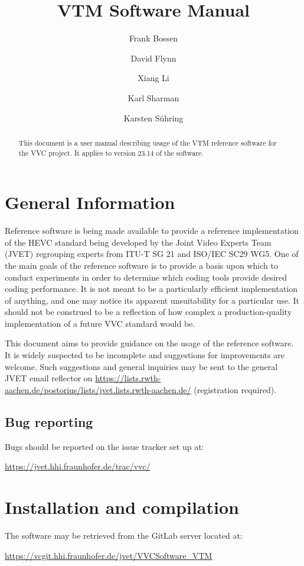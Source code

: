 \documentclass[a4paper,11pt]{jvetdoc}
\title{VTM Software Manual}
\author{%
	Frank Bossen
	\email{frank@bossentech.com}
	\and
	David Flynn
	\and
	Xiang Li
	\email{xlxiangli@google.com}
	\and
	Karl Sharman
	\email{karl.sharman@eu.sony.com}
	\and
	Karsten S\"uhring
	\email{karsten.suehring@hhi.fraunhofer.de}
}
\begin{document}
\maketitle
\begin{abstract}
This document is a user manual describing usage of the VTM reference software
for the VVC project. It applies to version 23.14 of the software.
\end{abstract}

\tableofcontents
\listoftables


\section{General Information}
Reference software is being made available to provide a reference
implementation of the HEVC standard being developed by the Joint 
Video Experts Team (JVET) regrouping experts from
ITU-T SG 21 and ISO/IEC SC29 WG5. One of the main goals of the
reference software is to provide a basis upon which to conduct
experiments in order to determine which coding tools provide desired
coding performance. It is not meant to be a particularly efficient
implementation of anything, and one may notice its apparent
unsuitability for a particular use. It should not be construed to be a
reflection of how complex a production-quality implementation of a
future VVC standard would be.

This document aims to provide guidance on the usage of the reference
software. It is widely suspected to be incomplete and suggestions for
improvements are welcome. Such suggestions and general inquiries may be
sent to the general JVET email reflector on
\url{https://lists.rwth-aachen.de/postorius/lists/jvet.lists.rwth-aachen.de/} 
(registration required).

\subsection*{Bug reporting}
Bugs should be reported on the issue tracker set up at:

\url{https://jvet.hhi.fraunhofer.de/trac/vvc/}

\section{Installation and compilation}
The software may be retrieved from the GitLab server located at:

\url{https://vcgit.hhi.fraunhofer.de/jvet/VVCSoftware_VTM}
\end{document}
